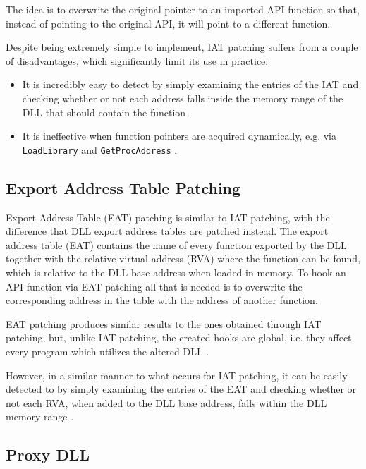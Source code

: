 The idea is to overwrite the original pointer to an imported API function so that, instead of pointing to the original API, it will point to a different function.

\newpage

Despite being extremely simple to implement, IAT patching suffers from a couple of disadvantages, which significantly limit its use in practice:
\begin{itemize}
    \item It is incredibly easy to detect by simply examining the entries of the IAT and checking whether or not each address falls inside the memory range of the DLL that should contain the function \cite{HookingDetection}.
    \item It is ineffective when function pointers are acquired dynamically, e.g. via \texttt{LoadLibrary} and \texttt{GetProcAddress} \cite{Buescher:2011:BIS:2186328.2186347}.
\end{itemize}

\subsection{Export Address Table Patching}

Export Address Table (EAT) patching is similar to IAT patching, with the difference that DLL export address tables are patched instead. The export address table (EAT) contains the name of every function exported by the DLL together with the relative virtual address (RVA) where the function can be found, which is relative to the DLL base address when loaded in memory. To hook an API function via EAT patching all that is needed is to overwrite the corresponding address in the table with the address of another function.

EAT patching produces similar results to the ones obtained through IAT patching, but, unlike IAT patching, the created hooks are global, i.e. they affect every program which utilizes the altered DLL \cite{Berdajs:2010:EAU:1815744.1815746}.

However, in a similar manner to what occurs for IAT patching, it can be easily detected to by simply examining the entries of the EAT and checking whether or not each RVA, when added to the DLL base address, falls within the DLL memory range \cite{Stuttard:2014:ADC:2616217}.

\subsection{Proxy DLL}

